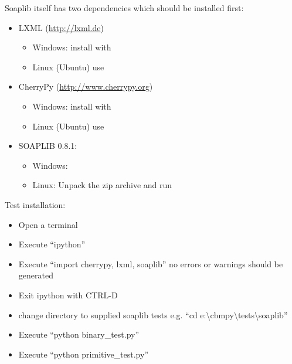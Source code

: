 \documentclass[a4paper,11pt,english]{sphinxmanual}
\begin{document}
Soaplib itself has two dependencies which should be installed first:
\begin{itemize}
\item {} 
LXML (\url{http://lxml.de})
\begin{itemize}
\item {} 
Windows: install with 

\item {} 
Linux (Ubuntu) use 

\end{itemize}

\item {} 
CherryPy (\url{http://www.cherrypy.org})
\begin{itemize}
\item {} 
Windows: install with 

\item {} 
Linux (Ubuntu) use 

\end{itemize}

\item {} 
SOAPLIB 0.8.1:
\begin{itemize}
\item {} 
Windows: 

\item {} 
Linux: Unpack the zip archive and run 

\end{itemize}

\end{itemize}

Test installation:
\begin{itemize}
\item {} 
Open a terminal

\item {} 
Execute ``ipython''

\item {} 
Execute ``import cherrypy, lxml, soaplib'' no errors or warnings should be generated

\item {} 
Exit ipython with CTRL-D

\item {} 
change directory to supplied soaplib tests e.g. ``cd e:\textbackslash{}cbmpy\textbackslash{}tests\textbackslash{}soaplib''

\item {} 
Execute ``python binary\_test.py''

\item {} 
Execute ``python primitive\_test.py''

\end{itemize}
\end{document}
